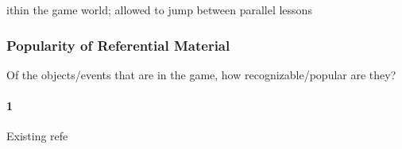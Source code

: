 ithin the game world; allowed to jump between parallel lessons\subsubsection{Popularity of Referential Material}Of the objects/events that are in the game, how recognizable/popular are they?\paragraph{1}Existing refe